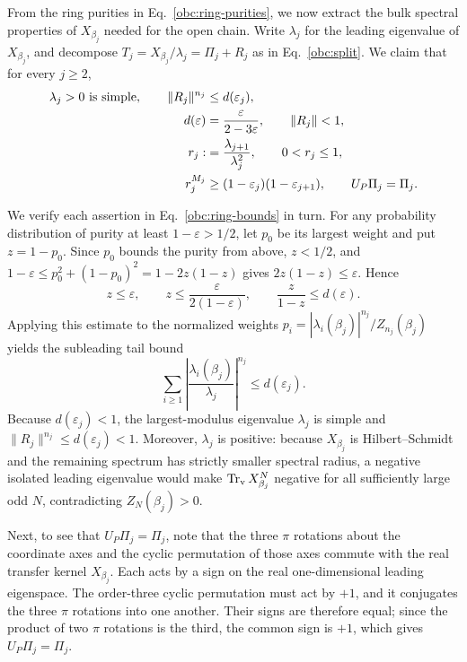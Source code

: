 From the ring purities in Eq.~\eqref{obc:ring-purities}, we now extract the bulk spectral properties of $X_{\beta_j}$ needed for the open chain. Write $\lambda_j$ for the leading eigenvalue of $X_{\beta_j}$, and decompose
$T_j=X_{\beta_j}/\lambda_j=\Pi_j+R_j$ as in Eq.~\eqref{obc:split}. We claim that for every $j\ge2$,
\begin{align}
 \lambda_j>0\text{ is simple},\qquad
 \|R_j\|^{n_j}&\le d(\varepsilon_j),\notag \\
 d(\varepsilon)&=\frac{\varepsilon}{2-3\varepsilon},
 \qquad \|R_j\|<1,\notag \\
 r_j:&=\frac{\lambda_{j+1}}{\lambda_j^2},\qquad
 0<r_j\le1,\notag \\
 r_j^{M_j}&\ge(1-\varepsilon_j)(1-\varepsilon_{j+1}),
 \qquad U_P\Pi_j=\Pi_j.
 \label{obc:ring-bounds}
\end{align}

We verify each assertion in Eq.~\eqref{obc:ring-bounds} in turn. For any probability distribution
of purity at least $1-\varepsilon>1/2$, let $p_0$ be its largest weight
and put $z=1-p_0$. Since $p_0$ bounds the purity from above, $z<1/2$, and $1-\varepsilon\le p_0^2+(1-p_0)^2=1-2z(1-z)$ gives $2z(1-z)\le\varepsilon$. Hence
\[
 z\le\varepsilon,\qquad
 z\le\frac{\varepsilon}{2(1-\varepsilon)},\qquad
 \frac{z}{1-z}\le d(\varepsilon).
\]
Applying this estimate to the normalized weights
$p_i=|\lambda_i(\beta_j)|^{n_j}/Z_{n_j}(\beta_j)$ yields the subleading tail bound
\begin{equation}
 \sum_{i\ge1}
 \left|\frac{\lambda_i(\beta_j)}{\lambda_j}\right|^{n_j}
 \le d(\varepsilon_j).
 \label{obc:full-tail}
\end{equation}
Because $d(\varepsilon_j)<1$, the largest-modulus eigenvalue $\lambda_j$ is simple and $\|R_j\|^{n_j}\le d(\varepsilon_j)<1$. Moreover, $\lambda_j$ is positive: because $X_{\beta_j}$ is Hilbert--Schmidt and the remaining spectrum has strictly smaller spectral radius, a negative isolated leading
eigenvalue would make $\operatorname{Tr}_{\mathrm v} X_{\beta_j}^N$ negative for all sufficiently
large odd $N$, contradicting $Z_N(\beta_j)>0$.

Next, to see that $U_P\Pi_j=\Pi_j$, note that the three $\pi$ rotations about the coordinate axes and the cyclic
permutation of those axes commute with the real transfer kernel $X_{\beta_j}$.
Each acts by a sign on the real one-dimensional leading eigenspace. The order-three cyclic
permutation must act by $+1$, and it conjugates the three $\pi$ rotations into one
another. Their signs are therefore equal; since the product of two $\pi$
rotations is the third, the common sign is $+1$, which gives
$U_P\Pi_j=\Pi_j$.

